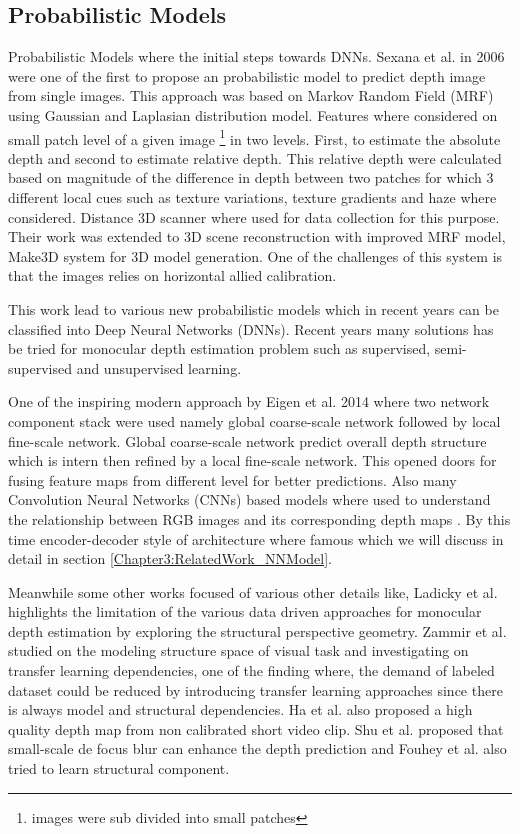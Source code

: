 \subsection{Probabilistic Models}
\label{Chapter3:RelatedWork_ProbabilisticModel}
Probabilistic Models where the initial steps towards DNNs. Sexana et al. \cite{saxena2006learning} in 2006 were one of the first to propose an probabilistic model to predict depth image from single images. This approach was based on Markov Random Field (MRF) using Gaussian and Laplasian distribution model. Features where considered on small patch level of a given image \footnote{images were sub divided into small patches} in two levels. First, to estimate the absolute depth and second to estimate relative depth. This relative depth were calculated based on magnitude of the difference in depth between two patches for which 3 different local cues such as texture variations, texture gradients and haze where considered. Distance 3D scanner where used for data collection for this purpose. Their work was extended to 3D scene reconstruction with improved MRF model, Make3D \cite{saxena2008make3d} system for 3D model generation. One of the challenges of this system is that the images relies on horizontal allied calibration. 

This work lead to various new probabilistic models which in recent years can be classified into Deep Neural Networks (DNNs). Recent years many solutions has be tried for monocular depth estimation problem such as supervised, semi-supervised and unsupervised learning.   

One of the inspiring modern approach by Eigen et al. 2014 \cite{eigen2014depth} where two network component stack were used namely global coarse-scale network followed by local fine-scale network. Global coarse-scale network predict overall depth structure which is intern then refined by a local fine-scale network. This opened doors for fusing feature maps from different level for better predictions.
Also many Convolution Neural Networks (CNNs) based models where used to understand the relationship between RGB images and its corresponding depth maps \cite{liu2015deep,laina2016deeper,Eigen_2015_ICCV,eigen2014depth, Alhashim2018}. By this time encoder-decoder style of architecture where famous\cite{Alhashim2018, hu2019revisiting} which we will discuss in detail in section \ref{Chapter3:RelatedWork_NNModel}. 

Meanwhile some other works focused of various other details like,  Ladicky et al. \cite{ladicky2014pulling} highlights the limitation of the various data driven approaches for monocular depth estimation by exploring the structural perspective  geometry. Zammir et al. \cite{zamir2018taskonomy} studied on the modeling structure space of visual task and investigating on transfer learning dependencies, one of the finding where, the demand of labeled dataset could be reduced by introducing transfer learning approaches since there is always model and structural dependencies. Ha et al. \cite{ha2016high} also proposed a high quality depth map from non calibrated short video clip. Shu et al. \cite{Shi2015BreakAR} proposed that small-scale de focus blur can enhance the depth prediction and Fouhey et al. \cite{Fouhey_2013_ICCV} also tried to learn structural component.

